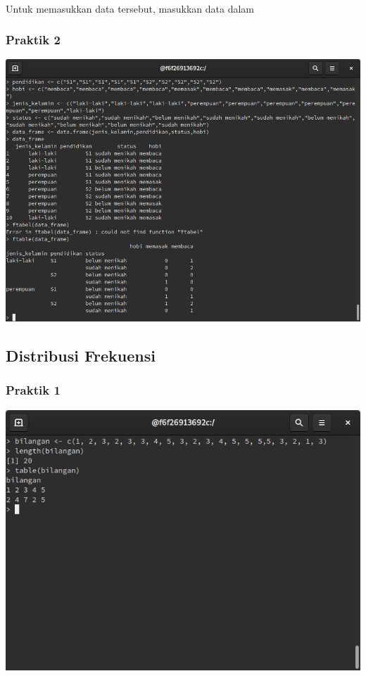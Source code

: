\documentclass[a4paper,12pt]{article}
\begin{document}
\paragraph{}
Untuk memasukkan data tersebut, masukkan data dalam 
\subsubsection{Praktik 2}
\includegraphics[width=\linewidth]{2}
\subsection{Distribusi Frekuensi}
\subsubsection{Praktik 1}
\includegraphics[width=\linewidth]{3}
\end{document}
